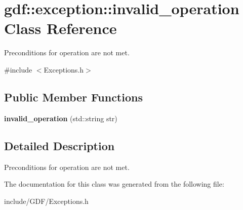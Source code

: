 \hypertarget{classgdf_1_1exception_1_1invalid__operation}{
\section{gdf::exception::invalid\_\-operation Class Reference}
\label{classgdf_1_1exception_1_1invalid__operation}
}


Preconditions for operation are not met.  




{\ttfamily \#include $<$Exceptions.h$>$}

\subsection*{Public Member Functions}
\begin{DoxyCompactItemize}
\item 
\hypertarget{classgdf_1_1exception_1_1invalid__operation_a6f9994c824ca966fa82c4650233e7626}{
{\bfseries invalid\_\-operation} (std::string str)}
\label{classgdf_1_1exception_1_1invalid__operation_a6f9994c824ca966fa82c4650233e7626}

\end{DoxyCompactItemize}


\subsection{Detailed Description}
Preconditions for operation are not met. 

The documentation for this class was generated from the following file:\begin{DoxyCompactItemize}
\item 
include/GDF/Exceptions.h\end{DoxyCompactItemize}
